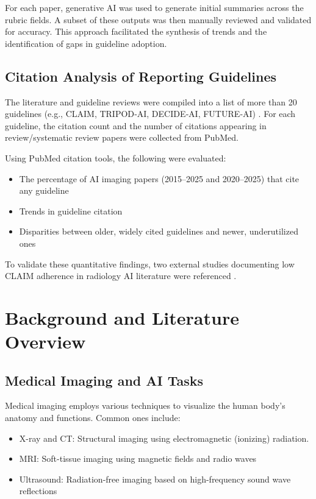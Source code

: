 \documentclass{article}
\begin{document}
For each paper, generative AI was used to generate initial summaries across the rubric fields. A subset of these outputs was then manually reviewed and validated for accuracy. This approach facilitated the synthesis of trends and the identification of gaps in guideline adoption.


\subsection{Citation Analysis of Reporting Guidelines}
The literature and guideline reviews were compiled into a list of more than 20 guidelines (e.g., CLAIM, TRIPOD‑AI, DECIDE‑AI, FUTURE‑AI) \cite{kolbinger_2024_reporting}. For each guideline, the citation count and the number of citations appearing in review/systematic review papers were collected from PubMed.

Using PubMed citation tools, the following were evaluated:

\begin{itemize}
\item The percentage of AI imaging papers (2015–2025 and 2020–2025) that cite any guideline
\item Trends in guideline citation
\item Disparities between older, widely cited guidelines and newer, underutilized ones
\end{itemize}

To validate these quantitative findings, two external studies documenting low CLAIM adherence in radiology AI literature were referenced \cite{belue_2023_the,burakkoak_2025_adherence}.

\section{Background and Literature Overview}
\subsection{Medical Imaging and AI Tasks}
Medical imaging employs various techniques to visualize the human body's anatomy and functions. Common ones include:

\begin{itemize}
\item X-ray and CT: Structural imaging using electromagnetic (ionizing) radiation.
\item MRI: Soft-tissue imaging using magnetic fields and radio waves
\item Ultrasound: Radiation-free imaging based on high-frequency sound wave reflections
\end{itemize}
\end{document}
